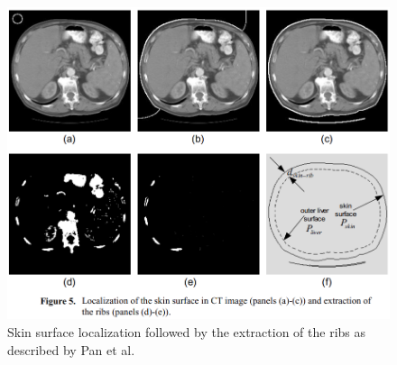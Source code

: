 \documentclass[]{article}
\begin{document}
	\begin{figure}[ht!]
		\centering
		\includegraphics[width=0.5\linewidth]{images/image7}
		\caption{Skin surface localization followed by the extraction of the ribs as described by Pan et al. \cite{Pan2001}}
		\label{Pan2001_Fig5}
	\end{figure}
	
\end{document}
